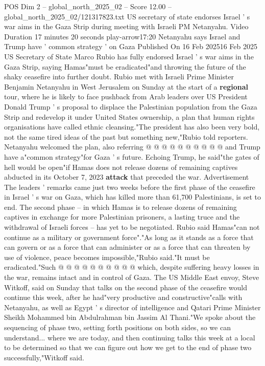 \begin{textsample}{POS Dim 2 – global\_north\_2025\_02 – Score 12.00 – global\_north\_2025\_02/121317823.txt}  \label{ex:f2_pos_440}
US secretary of state endorses Israel ' s war aims in the Gaza Strip during meeting with Israeli PM Netanyahu.
Video Duration 17 minutes 20 seconds play-arrow17:20 Netanyahu says Israel and Trump have ' common strategy ' on Gaza Published On 16 Feb 202516 Feb 2025 US Secretary of State Marco Rubio has fully endorsed Israel ' s war aims in the Gaza Strip, saying Hamas"must be eradicated"and throwing the future of the shaky ceasefire into further doubt.
Rubio met with Israeli Prime Minister Benjamin Netanyahu in West Jerusalem on Sunday at the start of a \textbf{regional} tour, where he is likely to face pushback from Arab leaders over US President Donald Trump ' s proposal to displace the Palestinian population from the Gaza Strip and redevelop it under United States ownership, a plan that human rights organisations have called ethnic cleansing."The president has also been very bold, not the same tired ideas of the past but something new,"Rubio told reporters.
Netanyahu welcomed the plan, also referring @ @ @ @ @ @ @ @ @ @ and Trump have a"common strategy"for Gaza ' s future.
Echoing Trump, he said"the gates of hell would be open"if Hamas does not release dozens of remaining captives abducted in its October 7, 2023 \textbf{attack} that preceded the war.
Advertisement The leaders ' remarks came just two weeks before the first phase of the ceasefire in Israel ' s war on Gaza, which has killed more than 61,700 Palestinians, is set to end.
The second phase -- in which Hamas is to release dozens of remaining captives in exchange for more Palestinian prisoners, a lasting truce and the withdrawal of Israeli forces -- has yet to be negotiated.
Rubio said Hamas"can not continue as a military or government force"."As long as it stands as a force that can govern or as a force that can administer or as a force that can threaten by use of violence, peace becomes impossible,"Rubio said."It must be eradicated."Such @ @ @ @ @ @ @ @ @ @ which, despite suffering heavy losses in the war, remains intact and in control of Gaza.
The US Middle East envoy, Steve Witkoff, said on Sunday that talks on the second phase of the ceasefire would continue this week, after he had"very productive and constructive"calls with Netanyahu, as well as Egypt ' s director of intelligence and Qatari Prime Minister Sheikh Mohammed bin Abdulrahman bin Jassim Al Thani."We spoke about the sequencing of phase two, setting forth positions on both sides, so we can understand... where we are today, and then continuing talks this week at a local to be determined so that we can figure out how we get to the end of phase two successfully,"Witkoff said.

\end{textsample}
